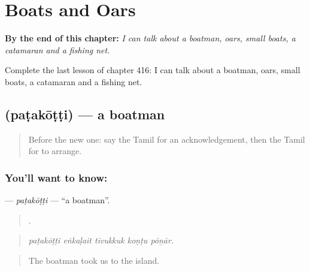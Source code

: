 
\chapter{Boats and Oars}
\label{ch:ta-boats-and-oars}

\begin{chapteropening}
\textbf{By the end of this chapter:} \emph{I can talk about a boatman, oars, small boats, a catamaran and a fishing net.}

Complete the last lesson of chapter 416: I can talk about a boatman, oars, small boats, a catamaran and a fishing net.
\end{chapteropening}

\section[\texorpdfstring{\ta{படகோட்டி} (paṭakōṭṭi)}{படகோட்டி (paṭakōṭṭi)}]{ (paṭakōṭṭi) — a boatman}

\label{lesson:TA-C416-patakotti}



\begin{quote}
Before the new one: say the Tamil for an acknowledgement, then the Tamil for to arrange.
\end{quote}

\subsection*{You'll want to know: }
\textbf{} — \emph{paṭakōṭṭi} — \textquotedblleft{}a boatman\textquotedblright{}.

\begin{quote}
    .
\end{quote}

\begin{quote}
\emph{paṭakōṭṭi eṅkaḷait tīvukkuk koṇṭu pōṉār.}
\end{quote}

\begin{quote}
The boatman took us to the island.
\end{quote}

